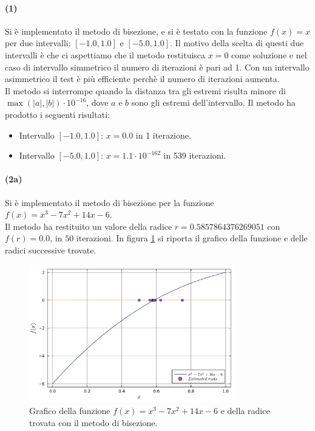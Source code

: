 \documentclass[letterpaper, 12pt]{article}
\begin{document}
\paragraph{(1) } Si è implementato il metodo di bisezione, e si è testato con la funzione $f(x)=x$ per due 
intervalli: $[-1.0, 1.0]$ e $[-5.0, 1.0]$. Il motivo della scelta di questi due intervalli è che ci aspettiamo che
il metodo restituisca $x = 0$ come soluzione e nel caso di intervallo simmetrico il numero di iterazioni 
è pari ad 1. Con un intervallo asimmetrico il test è più efficiente perchè il numero di iterazioni aumenta. \\
Il metodo si interrompe quando la distanza tra gli estremi risulta minore di $\max(|a|,|b|) \cdot 10^{-16}$,
dove $a$ e $b$ sono gli estremi dell'intervallo. Il metodo ha prodotto i seguenti risultati:
\begin{itemize}
    \item Intervallo $[-1.0, 1.0]$: $x = 0.0$ in 1 iterazione.
    \item Intervallo $[-5.0, 1.0]$: $x = 1.1 \cdot 10^{-162}$ in 539 iterazioni.
\end{itemize}

\paragraph{(2a) } Si è implementato il metodo di bisezione per la funzione $f(x) = x^3 - 7x^2 + 14x - 6$. \\
Il metodo ha restituito un valore della radice $r = 0.5857864376269051$ con $f(r) = 0.0$, in $50$ iterazioni. In
figura \ref{fig:es3_2_2_1} si riporta il grafico della funzione e delle radici successive trovate.
\begin{figure}
    \centering
    \includegraphics[width=0.8\textwidth]{3221.pdf}
    \caption{Grafico della funzione $f(x) = x^3 - 7x^2 + 14x - 6$ e della radice trovata con il metodo di bisezione.}
    \label{fig:es3_2_2_1}
\end{figure} 
\end{document}
